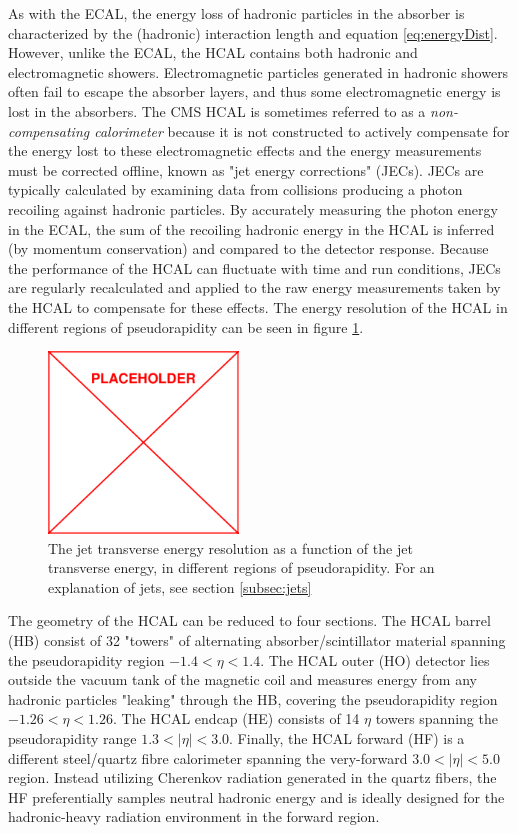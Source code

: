 As with the ECAL, the energy loss of hadronic particles in the absorber is characterized by the (hadronic) interaction length and equation \ref{eq:energyDist}. However, unlike the ECAL, the HCAL contains both hadronic and electromagnetic showers. Electromagnetic particles generated in hadronic showers  often fail to escape the absorber layers, and thus some electromagnetic energy is lost in the absorbers. The CMS HCAL is sometimes referred to as a {\it non-compensating calorimeter} because it is not constructed to actively compensate for the energy lost to these electromagnetic effects and the energy measurements must be corrected offline, known as "jet energy corrections" (JECs).  JECs are typically calculated by examining data from collisions producing a photon recoiling against  hadronic particles. By accurately measuring the photon energy in the ECAL, the sum of the recoiling hadronic energy in the HCAL is inferred (by momentum conservation) and compared to the detector response. Because the performance of the HCAL can fluctuate with time and run conditions, JECs are regularly recalculated and applied to the raw energy measurements taken by the HCAL to compensate for these effects. The energy resolution of the HCAL in different regions of pseudorapidity can be seen in figure \ref{fig:hcalSigma}.
 \begin{figure}
	\centering
	\includegraphics[width=0.45\textwidth]{figs/placeholder}
	\caption{The jet transverse energy resolution as a function of the jet transverse energy, in different regions of pseudorapidity. For an explanation of jets, see section \ref{subsec:jets}}
	\label{fig:hcalSigma}
\end{figure}

The geometry of the HCAL can be reduced to four sections. The HCAL barrel (HB) consist of 32 "towers" of alternating absorber/scintillator material spanning the pseudorapidity region $-1.4<\eta<1.4$. The HCAL outer (HO) detector lies outside the vacuum tank of the magnetic coil and measures energy from any hadronic particles "leaking" through the HB, covering the pseudorapidity region $-1.26<\eta<1.26$. The HCAL endcap (HE) consists of 14 $\eta$ towers spanning the pseudorapidity range $1.3<|\eta|<3.0$. Finally, the HCAL forward (HF) is a different steel/quartz fibre calorimeter spanning the very-forward $3.0<|\eta|<5.0$ region. Instead utilizing Cherenkov radiation generated in the quartz fibers, the HF preferentially samples neutral hadronic energy and is ideally designed for the hadronic-heavy radiation environment in the forward region.

